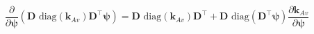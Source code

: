 \begin{equation}
\label{eq:richards-newton-deriv-detail}
\frac{\partial}{\partial\boldsymbol{\psi}}
\left(
\mathbf{D}
    \text{ diag}\left(\mathbf{k}_{Av}\right)
\mathbf{D}^{\top} \boldsymbol{\psi}
\right)
=
\mathbf{D}
    \text{ diag}\left(\mathbf{k}_{Av}\right)
\mathbf{D}^{\top}
+
\mathbf{D}
    \text{ diag}\left(\mathbf{D}^{\top}\boldsymbol{\psi}\right)
\frac{\partial\mathbf{k}_{Av}}{\partial\boldsymbol{\psi}}
\end{equation}
